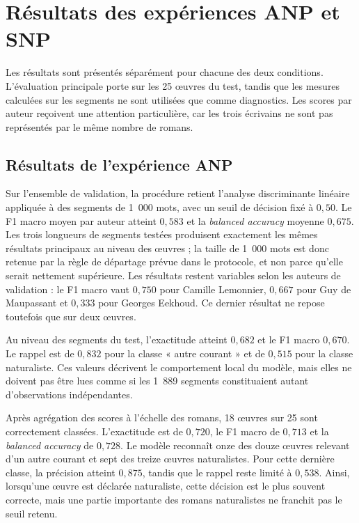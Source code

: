 \section{Résultats des expériences ANP et SNP}
\label{sec:resultats_anp_snp}

Les résultats sont présentés séparément pour chacune des deux conditions. L'évaluation principale porte sur les 25 œuvres du test, tandis que les mesures calculées sur les segments ne sont utilisées que comme diagnostics. Les scores par auteur reçoivent une attention particulière, car les trois écrivains ne sont pas représentés par le même nombre de romans.

\subsection{Résultats de l'expérience ANP}

Sur l'ensemble de validation, la procédure retient l'analyse discriminante linéaire appliquée à des segments de 1~000 mots, avec un seuil de décision fixé à $0{,}50$. Le F1 macro moyen par auteur atteint $0{,}583$ et la \textit{balanced accuracy} moyenne $0{,}675$. Les trois longueurs de segments testées produisent exactement les mêmes résultats principaux au niveau des œuvres ; la taille de 1~000 mots est donc retenue par la règle de départage prévue dans le protocole, et non parce qu'elle serait nettement supérieure. Les résultats restent variables selon les auteurs de validation : le F1 macro vaut $0{,}750$ pour Camille Lemonnier, $0{,}667$ pour Guy de Maupassant et $0{,}333$ pour Georges Eekhoud. Ce dernier résultat ne repose toutefois que sur deux œuvres.

Au niveau des segments du test, l'exactitude atteint $0{,}682$ et le F1 macro $0{,}670$. Le rappel est de $0{,}832$ pour la classe « autre courant » et de $0{,}515$ pour la classe naturaliste. Ces valeurs décrivent le comportement local du modèle, mais elles ne doivent pas être lues comme si les 1~889 segments constituaient autant d'observations indépendantes.

Après agrégation des scores à l'échelle des romans, 18 œuvres sur 25 sont correctement classées. L'exactitude est de $0{,}720$, le F1 macro de $0{,}713$ et la \textit{balanced accuracy} de $0{,}728$. Le modèle reconnaît onze des douze œuvres relevant d'un autre courant et sept des treize œuvres naturalistes. Pour cette dernière classe, la précision atteint $0{,}875$, tandis que le rappel reste limité à $0{,}538$. Ainsi, lorsqu'une œuvre est déclarée naturaliste, cette décision est le plus souvent correcte, mais une partie importante des romans naturalistes ne franchit pas le seuil retenu.

